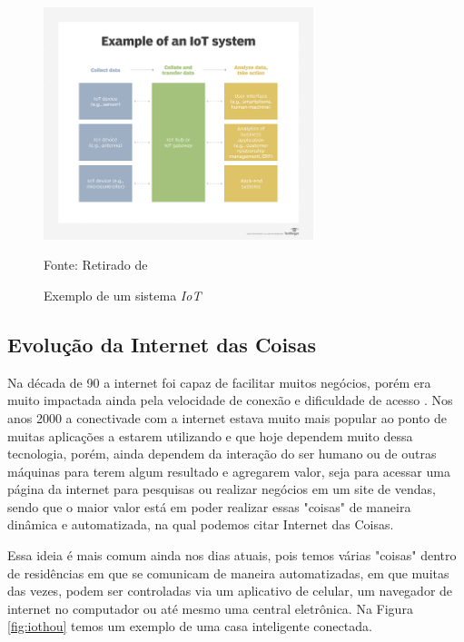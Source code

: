 \documentclass[../../layout.tex]{subfiles}
\begin{document}
\begin{figure}[H]
\centering
\caption{Exemplo de um sistema \emph{IoT}}
\includegraphics[width=0.7\textwidth]{assets/static/img/iot_system.jpg}
\label{fig:iotsystem}

\begin{minipage}{0.5\textwidth}
\raggedright \footnotesize Fonte: Retirado de  
\end{minipage}
\end{figure}

\subsection{Evolução da Internet das Coisas}
\hspace*{3em}Na década de 90 a internet foi capaz de facilitar muitos negócios, porém era muito impactada ainda pela velocidade de conexão e dificuldade de acesso \cite{iot_evolution}. Nos anos 2000 a conectivade com a internet estava muito mais popular ao ponto de muitas aplicações a estarem utilizando e que hoje dependem muito dessa tecnologia, porém, ainda dependem da interação do ser humano ou de outras máquinas para terem algum resultado e agregarem valor, seja para acessar uma página da internet para pesquisas ou realizar negócios em um site de vendas, sendo que o maior valor está em poder realizar essas "coisas" de maneira dinâmica e automatizada, na qual podemos citar Internet das Coisas. \par
\hspace*{3em}Essa ideia é mais comum ainda nos dias atuais, pois temos várias "coisas" dentro de residências em que se comunicam de maneira automatizadas, em que muitas das vezes, podem  ser controladas via um aplicativo de celular, um navegador de internet no computador ou até mesmo uma central eletrônica. Na Figura \ref{fig:iothou} temos um exemplo de uma casa inteligente conectada.
\end{document}
